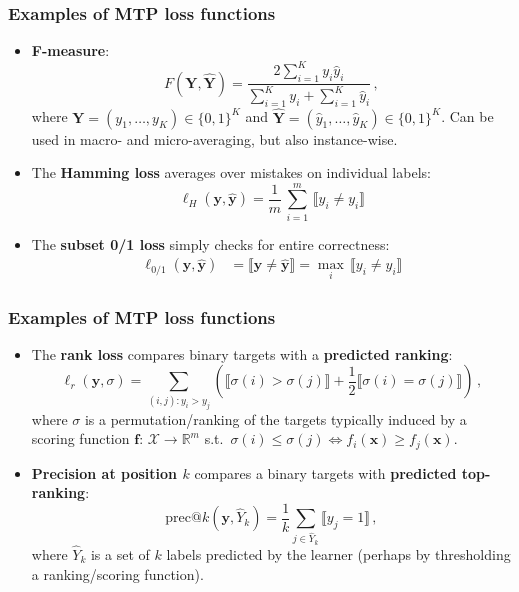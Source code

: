 \documentclass[]{beamer}
\renewcommand{\vec}[1]{\boldsymbol{#1}}
\newcommand{\bx}{\boldsymbol{x}}
\newcommand{\by}{\boldsymbol{y}}
\newcommand{\assert}[1]{\llbracket #1 \rrbracket}
\renewcommand{\emph}[1]{\textbf{\color{putblue}#1}}
\begin{document}
\begin{frame}
\frametitle{Examples of MTP loss functions}
\begin{itemize}

\item \emph{F-measure}:
$$
F(\mathbf{Y}, \hat{\mathbf{Y}}) = \frac{2 \sum_{i=1}^K y_i \hat{y}_i}{\sum_{i=1}^K y_i + \sum_{i=1}^K \hat{y}_i} \, ,
$$
where $\mathbf{Y} = (y_1, \ldots , y_K) \in \{ 0,1 \}^K$ and $\hat{\mathbf{Y}} = (\hat{y}_1, \ldots , \hat{y}_K) \in \{ 0,1 \}^K$. Can be used in macro- and micro-averaging, but also instance-wise. 



\item The \emph{Hamming loss} averages over mistakes on individual labels:    
$$
\ell_H(\by, \hat{\by}) = \frac{1}{m}  \, \sum_{i=1}^m \, \assert{y_i \neq  y_i}
$$

\pause

\item The \emph{subset 0/1 loss} simply checks for entire correctness:  
\begin{align*}
\ell_{0/1}(\by, \hat{\by}) & = \assert{\by \ne \hat{\by}} =  \max_i \, \assert{y_i \neq  y_i}
\end{align*}


\end{itemize}
\end{frame}



\begin{frame}
\frametitle{Examples of MTP loss functions}
\begin{itemize}

\item
The \emph{rank loss} compares binary targets with a \emph{predicted ranking}:
$$
\ell_r(\vec{y},\sigma) = \sum_{(i,j): y_i > y_j}  \left (\llbracket \sigma(i) > \sigma(j) \rrbracket + \frac{1}{2} \llbracket \sigma(i)  = \sigma (j) \rrbracket  \right) \, ,
$$
where $\sigma$ is a permutation/ranking of the targets typically induced by a scoring function $\boldsymbol{f}:\, \mathcal{X} \rightarrow \mathbb{R}^m$ s.t.\ $\sigma(i) \leq \sigma(j) \Leftrightarrow f_i(\bx) \geq f_j(\bx)$. 

\pause 

\item \emph{Precision at position $k$} compares a binary targets with \emph{predicted top-ranking}:
$$
\mathrm{prec}@k(\by, \hat{Y}_k) = \frac{1}{k} \sum_{j \in \hat{Y}_k} \assert{y_j = 1} \,,
$$
where $\hat{Y}_k$ is a set of $k$ labels predicted by the learner (perhaps by thresholding a ranking/scoring function).

\end{itemize}

\end{frame}
\end{document}
